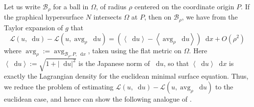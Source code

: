 \documentclass[reqno,11pt]{amsart}
\DeclareMathOperator{\avg}{avg}
\newcommand*\dif{\mathop{}\!\mathrm{d}}
\newcommand{\Lagrange}{\mathscr L}
\def\Japan#1{\left \langle #1 \right \rangle}
\theoremstyle{definition}
\numberwithin{equation}{section}
\begin{document}
Let us write $\mathscr B_\rho$ for a ball in $\Omega$, of radius $\rho$ centered on the coordinate origin $P$.
If the graphical hypersurface $N$ intersects $\Omega$ at $P$, then on $\mathscr B_\rho$, we have from the Taylor expansion of $g$ that
\begin{equation}\label{approximate by euclidean lagrangian}
\Lagrange(u, \dif u) - \Lagrange(u, \avg_\rho \dif u) = \left(\Japan{\dif u} - \Japan{\avg_\rho \dif u}\right) \dif x + O(\rho^2)
\end{equation}
where $\avg_\rho := \avg_{\mathscr B_\rho, P, \dif x}$, taken using the flat metric on $\Omega$.
Here $\Japan{\dif u} := \sqrt{1 + |\dif u|^2}$ is the Japanese norm of $\dif u$, so that $\Japan{\dif u} \dif x$ is exactly the Lagrangian density for the euclidean minimal surface equation.
Thus, we reduce the problem of estimating $\Lagrange(u, \dif u) - \Lagrange(u, \avg_\rho \dif u)$ to the euclidean case, and hence can show the following analogue of \cite[Lemma 6.3]{Giusti77}.
\end{document}
